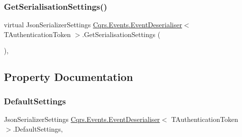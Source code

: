 \subsubsection{\texorpdfstring{Get\+Serialisation\+Settings()}{GetSerialisationSettings()}}
{\footnotesize\ttfamily virtual Json\+Serializer\+Settings \hyperlink{classCqrs_1_1Events_1_1EventDeserialiser}{Cqrs.\+Events.\+Event\+Deserialiser}$<$ T\+Authentication\+Token $>$.Get\+Serialisation\+Settings (\begin{DoxyParamCaption}{ }\end{DoxyParamCaption})\hspace{0.3cm}{\ttfamily [protected]}, {\ttfamily [virtual]}}



\subsection{Property Documentation}
\mbox{\label{classCqrs_1_1Events_1_1EventDeserialiser_a08bd067ca7ce8c28c7a83d444b7e468b_a08bd067ca7ce8c28c7a83d444b7e468b}} 
\subsubsection{\texorpdfstring{Default\+Settings}{DefaultSettings}}
{\footnotesize\ttfamily Json\+Serializer\+Settings \hyperlink{classCqrs_1_1Events_1_1EventDeserialiser}{Cqrs.\+Events.\+Event\+Deserialiser}$<$ T\+Authentication\+Token $>$.Default\+Settings\hspace{0.3cm}{\ttfamily [static]}, {\ttfamily [get]}}

